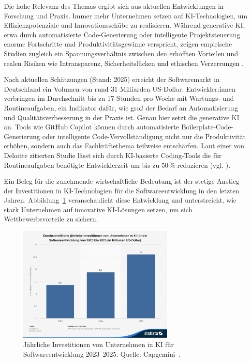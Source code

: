 Die hohe Relevanz des Themas ergibt sich aus aktuellen Entwicklungen in
Forschung und Praxis. Immer mehr Unternehmen setzen auf KI-Technologien, um
Effizienzpotenziale und Innovationsschübe zu realisieren. Während generative
KI, etwa durch automatisierte Code-Generierung oder intelligente
Projektsteuerung enorme Fortschritte und Produktivitätsgewinne verspricht,
zeigen empirische Studien zugleich ein Spannungsverhältnis zwischen den
erhofften Vorteilen und realen Risiken wie Intransparenz, Sicherheitslücken und
ethischen Verzerrungen \cite{weisz_design_2024}.

Nach aktuellen Schätzungen (Stand: 2025) erreicht der Softwaremarkt in
Deutschland ein Volumen von rund 31 Milliarden US-Dollar. Entwickler:innen
verbringen im Durchschnitt bis zu 17 Stunden pro Woche mit Wartungs- und
Routineaufgaben, ein Indikator dafür, wie groß der Bedarf an Automatisierung
und Qualitätsverbesserung in der Praxis ist. Genau hier setzt die generative KI
an. Tools wie GitHub Copilot können durch automatisierte
Boilerplate-Code-Generierung oder intelligente Code-Vervollständigung nicht nur
die Produktivität erhöhen, sondern auch das Fachkräftethema teilweise
entschärfen. Laut einer von Deloitte zitierten Studie lässt sich durch
KI-basierte Coding-Tools die für Routineaufgaben benötigte Entwicklerzeit um
bis zu 50\,\% reduzieren (vgl. \cite{s_future_2024}
\cite{siebert_generative_2024}).

Ein Beleg für die zunehmende wirtschaftliche Bedeutung ist der stetige Anstieg
der Investitionen in KI-Technologien für die Softwareentwicklung in den letzten
Jahren. Abbildung~\ref{fig:ki-investitionen} veranschaulicht diese Entwicklung
und unterstreicht, wie stark Unternehmen auf innovative KI-Lösungen setzen, um
sich Wettbewerbsvorteile zu sichern.

\begin{figure}[H]
    \centering
    \vspace{1em}
    \includegraphics[width=0.7\textwidth]{images/abbildungen/statistic_id1481131_jaehrliche-investitionen-von-unternehmen-in-ki-fuer-softwareentwicklung-bis-2025.png}
    \caption{Jährliche Investitionen von Unternehmen in KI für Softwareentwicklung 2023–2025. Quelle: Capgemini~\cite{statista_ki_investitionen_2025}.}
    \label{fig:ki-investitionen}
\end{figure}

